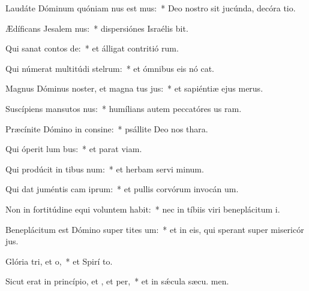 \item Laudáte Dóminum quóniam nus est mus:~* Deo nostro sit jucúnda, decóra tio.
\item Ædíficans Jesalem nus:~* dispersiónes Israélis bit.
\item Qui sanat contos de:~* et álligat contritió rum.
\item Qui númerat multitúdi stelrum:~* et ómnibus eis nó cat.
\item Magnus Dóminus noster, et magna tus jus:~* et sapiéntiæ ejus   merus.
\item Suscípiens mansutos nus:~* humílians autem peccatóres us  ram.
\item Præcínite Dómino in consine:~* psállite Deo nos  thara.
\item Qui óperit lum bus:~* et parat  viam.
\item Qui prodúcit in tibus num:~* et herbam servi minum.
\item Qui dat juméntis cam iprum:~* et pullis corvórum invocán um.
\item Non in fortitúdine equi voluntem habit:~* nec in tíbiis viri beneplácitum  i.
\item Beneplácitum est Dómino super tites um:~* et in eis, qui sperant super misericór jus.
\item Glória tri, et o,~* et Spirí to.
\item Sicut erat in princípio, et , et per,~* et in sǽcula sæcu. men.
